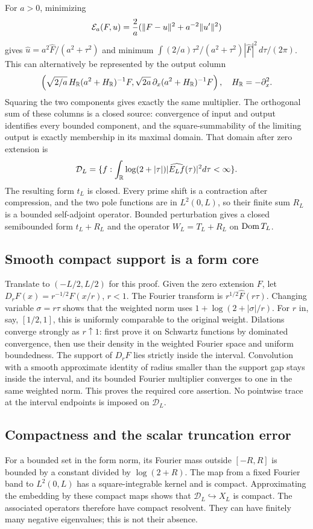 For $a>0$, minimizing
\[
\mathcal E_a(F,u)=\frac2a(\lVert F-u\rVert^2+a^{-2}\lVert u'\rVert^2)
\]
gives $\widehat u=a^2\widehat F/(a^2+\tau^2)$ and minimum
$\int (2/a)\tau^2/(a^2+\tau^2)|\widehat F|^2\,d\tau/(2\pi)$.
This can alternatively be represented by the output column
\[
\left(\sqrt{2/a}\,H_\mathbb R(a^2+H_\mathbb R)^{-1}F,
\sqrt{2a}\,\partial_x(a^2+H_\mathbb R)^{-1}F\right),\quad H_\mathbb R=-\partial_x^2.
\]
Squaring the two components gives exactly the same multiplier. The
orthogonal sum of these columns is a closed source: convergence of input
and output identifies every bounded component, and the square-summability
of the limiting output is exactly membership in its maximal domain.
That domain after zero extension is
\begin{equation}\label{d:domain}
\mathcal D_L=\{f:\int_\mathbb R\log(2+|\tau|)|\widehat{E_Lf}(\tau)|^2d\tau<\infty\}.
\end{equation}
The resulting form $t_L$ is closed. Every prime shift is a contraction
after compression, and the two pole functions are in $L^2(0,L)$, so their
finite sum $R_L$ is a bounded self-adjoint operator. Bounded perturbation
gives a closed semibounded form $t_L+R_L$ and the operator
$W_L=T_L+R_L$ on $\operatorname{Dom} T_L$.

\subsection{Smooth compact support is a form core}
Translate to $(-L/2,L/2)$ for this proof. Given the zero extension $F$,
let $D_rF(x)=r^{-1/2}F(x/r)$, $r<1$. The Fourier transform is
$r^{1/2}\widehat F(r\tau)$. Changing variable $\sigma=r\tau$ shows that
the weighted norm uses $1+\log(2+|\sigma|/r)$. For $r$ in, say,
$[1/2,1]$, this is uniformly comparable to the original weight.
Dilations converge strongly as $r\uparrow1$: first prove it on Schwartz
functions by dominated convergence, then use their density in the weighted
Fourier space and uniform boundedness. The support of $D_rF$ lies strictly
inside the interval. Convolution with a smooth approximate identity of
radius smaller than the support gap stays inside the interval, and its
bounded Fourier multiplier converges to one in the same weighted norm.
This proves the required core assertion. No pointwise trace at the
interval endpoints is imposed on $\mathcal D_L$.

\subsection{Compactness and the scalar truncation error}
For a bounded set in the form norm, its Fourier mass outside $[-R,R]$ is
bounded by a constant divided by $\log(2+R)$. The map from a fixed Fourier
band to $L^2(0,L)$ has a square-integrable kernel and is compact. Approximating
the embedding by these compact maps shows that $\mathcal D_L\hookrightarrow X_L$
is compact. The associated operators therefore have compact resolvent.
They can have finitely many negative eigenvalues; this is not their absence.

